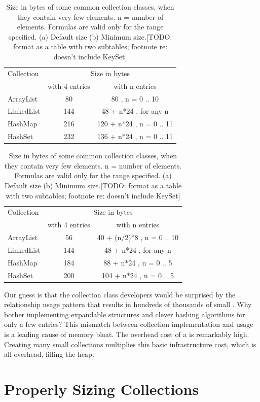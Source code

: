\begin{table}
\centering
 		\begin{tabular}{lcc}
 		\toprule
	 	 Collection & \multicolumn{2}{c}{Size in bytes} \\
	 	 & with 4 entries & with n entries \\
	 	 \midrule
	 	ArrayList & 80 & 80 , n = 0 .. 10 \\
 		LinkedList & 144 & 48 + n*24 , for any n \\
 		HashMap & 216 & 120 + n*24 , n = 0 .. 11 \\
 		HashSet & 232 & 136 + n*24 , n = 0 .. 11 \\
	 	\bottomrule
	 	\end{tabular}
	 	
 		\begin{tabular}{lcc}
 		\toprule
	 	 Collection & \multicolumn{2}{c}{Size in bytes} \\
	 	 & with 4 entries & with n entries \\
	 	 \midrule
	 	ArrayList & 56 & 40 + (n/2)*8 , n = 0 .. 10 \\
 		LinkedList & 144 & 48 + n*24 , for any n\\
 		HashMap & 184 & 88 + n*24 , n = 0 .. 5 \\
 		HashSet & 200 & 104 + n*24 , n = 0 .. 5 \\
	 	\bottomrule
 	 	\end{tabular}
	\caption{Size in bytes of some common collection classes, when they contain very few
	elements. n = number of elements. Formulas are valid only for the range specified. (a) Default size
	(b) Minimum size.[TODO: format as a table with two subtables; footnote re: doesn't include KeySet]}
	\label{tab:small-collection-costs}
\end{table}

Our guess is that the
collection class developers would be surprised by the relationship usage pattern
that results in hundreds of thousands of small . Why bother
implementing expandable structures and clever hashing algorithms for only a few entries?
This mismatch between collection implementation and usage is 
a leading cause of memory bloat. The overhead cost of a  is
remarkably high. Creating many small collections multiplies this basic infrastructure
cost, which is all overhead, filling the heap. 
 

\section{Properly Sizing Collections}
\label{sec:proper-size}


